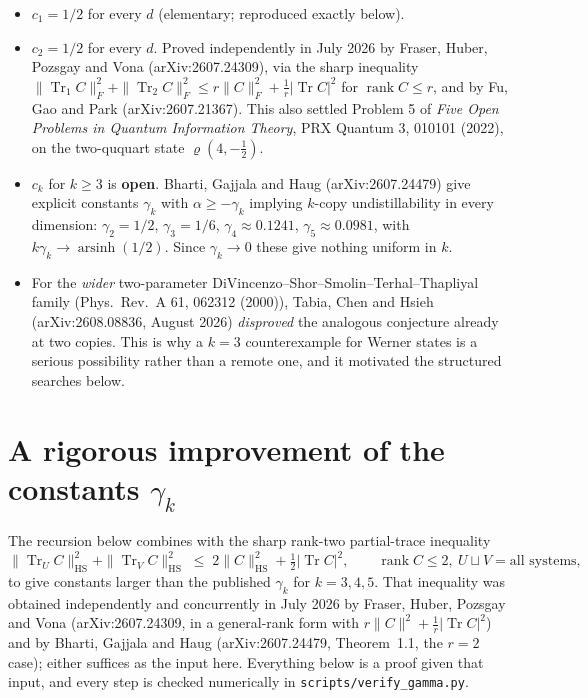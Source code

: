 \documentclass[11pt]{article}
\theoremstyle{definition}
\theoremstyle{plain}
\newcommand{\HS}{\mathrm{HS}}
\newcommand{\Tr}{\operatorname{Tr}}
\begin{document}
\begin{itemize}
\item $c_1=1/2$ for every $d$ (elementary; reproduced exactly below).
\item $c_2=1/2$ for every $d$. Proved independently in July 2026 by Fraser, Huber,
Pozsgay and Vona (arXiv:2607.24309), via the sharp inequality
$\|\Tr_1C\|_F^2+\|\Tr_2C\|_F^2\le r\|C\|_F^2+\tfrac1r|\Tr C|^2$ for
$\operatorname{rank}C\le r$, and by Fu, Gao and Park (arXiv:2607.21367). This also settled
Problem 5 of \emph{Five Open Problems in Quantum Information Theory}, PRX Quantum 3,
010101 (2022), on the two-ququart state $\varrho(4,-\tfrac12)$.
\item $c_k$ for $k\ge3$ is \textbf{open}. Bharti, Gajjala and Haug (arXiv:2607.24479)
give explicit constants $\gamma_k$ with $\alpha\ge-\gamma_k$ implying $k$-copy
undistillability in every dimension: $\gamma_2=1/2$, $\gamma_3=1/6$,
$\gamma_4\approx0.1241$, $\gamma_5\approx0.0981$, with $k\gamma_k\to\operatorname{arsinh}(1/2)$.
Since $\gamma_k\to0$ these give nothing uniform in $k$.
\item For the \emph{wider} two-parameter DiVincenzo--Shor--Smolin--Terhal--Thapliyal
family (Phys.\ Rev.\ A 61, 062312 (2000)), Tabia, Chen and Hsieh (arXiv:2608.08836,
August 2026) \emph{disproved} the analogous conjecture already at two copies. This is why
a $k=3$ counterexample for Werner states is a serious possibility rather than a remote one,
and it motivated the structured searches below.
\end{itemize}

\section{A rigorous improvement of the constants $\gamma_k$}
\label{sec:gamma}

The recursion below combines with the sharp rank-two partial-trace inequality
\[
\|\Tr_UC\|_\HS^2+\|\Tr_VC\|_\HS^2\;\le\;2\|C\|_\HS^2+\tfrac12|\Tr C|^2,
\qquad \operatorname{rank}C\le2,\ U\sqcup V=\text{all systems},
\]
to give constants larger than the published $\gamma_k$ for $k=3,4,5$. That inequality was
obtained independently and concurrently in July 2026 by Fraser, Huber, Pozsgay and Vona
(arXiv:2607.24309, in a general-rank form with $r\|C\|^2+\tfrac1r|\Tr C|^2$) and by
Bharti, Gajjala and Haug (arXiv:2607.24479, Theorem~1.1, the $r=2$ case); either suffices
as the input here. Everything below is a proof given that input, and every step is checked
numerically in \texttt{scripts/verify\_gamma.py}.
\end{document}
